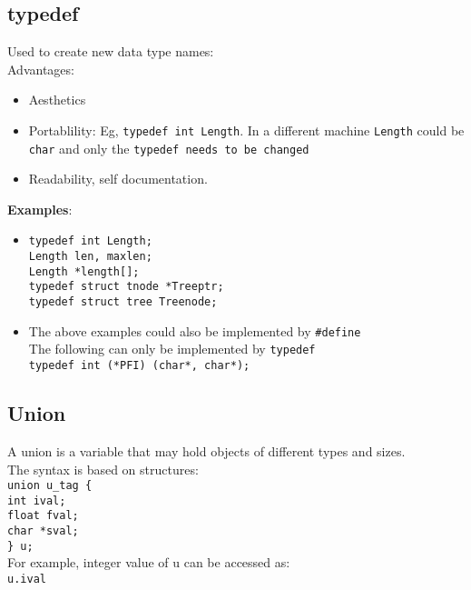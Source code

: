 \begin{multicols*}{3}
\subsection{typedef}
Used to create new data type names:\\
Advantages:\\
\begin{itemize}
	\item Aesthetics
	\item Portablility: Eg, \texttt{typedef int Length}. In a different machine \texttt{Length} could be \texttt{char} and only the \texttt{typedef needs to be changed}
	\item Readability, self documentation.
\end{itemize}
\textbf{Examples}:\\
\begin{itemize}
	\item
		\texttt{typedef int Length;}\\
		\texttt{Length len, maxlen;}\\
		\texttt{Length *length[];}\\
		\texttt{typedef struct tnode *Treeptr;}\\
		\texttt{typedef struct tree Treenode;}\\
	\item The above examples could also be implemented by \texttt{\#define}\\
		The following can only be implemented by \texttt{typedef}\\
		\texttt{typedef int (*PFI) (char*, char*);}
\end{itemize}

\subsection{Union}
A union is a variable that may hold objects of different types and sizes.\\
The syntax is based on structures:\\
\texttt{union u\_tag \{}\\
\texttt{\qquad int ival;}\\
\texttt{\qquad float fval;}\\
\texttt{\qquad char *sval;}\\
\texttt{\} u;}\\

For example, integer value of u can be accessed as:\\
\texttt{u.ival}


\end{multicols*}
